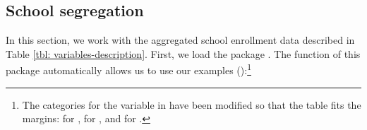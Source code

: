 \subsection{School segregation}

In this section, we work with the aggregated school enrollment data described in Table \ref{tbl: variables-description}. First, we load the package . The  function of this package automatically allows us to use our examples ():\footnote{The  categories for the variable  in  have been modified so that the table fits the margins:  for ,  for , and  for .}

